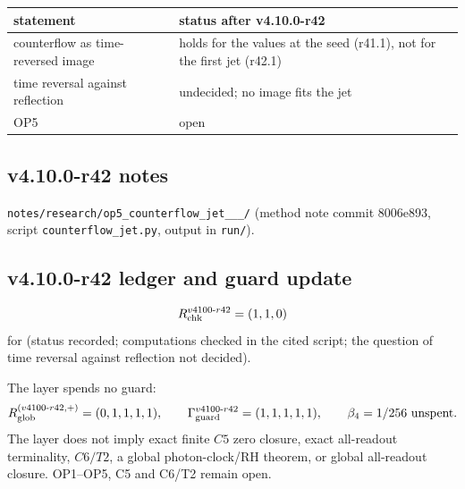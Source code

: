 \begin{center}
\small
\begin{tabular}{@{}>{\raggedright\arraybackslash}p{}>{\raggedright\arraybackslash}p{}@{}}
\toprule
statement & status after v4.10.0-r42\\
\midrule
counterflow as time-reversed image & holds for the values at the seed (r41.1), not for the first jet (r42.1)\\
time reversal against reflection & undecided; no image fits the jet\\
OP5 & open\\
\bottomrule
\end{tabular}
\end{center}

\subsection*{v4.10.0-r42 notes}
\label{subsec:v4100-r42-notes}

\texttt{notes/\allowbreak research/\allowbreak op5\_\allowbreak counterflow\_\allowbreak jet\_\_\_/} (method note commit 8006e893,
script \texttt{counterflow\_\allowbreak jet.py}, output in \texttt{run/}).

\subsection*{v4.10.0-r42 ledger and guard update}
\label{subsec:v4100-r42-ledger-guard}

\[
R_{\rm chk}^{v4100\text{-}r42}=(1,1,0)
\]
for (status recorded; computations checked in the cited script; the question of time reversal against reflection not decided).

The layer spends no guard:
\[
R_{\rm glob}^{(v4100\text{-}r42,+)}=(0,1,1,1,1),
\qquad
\Gamma_{\rm guard}^{v4100\text{-}r42}=(1,1,1,1,1),
\qquad
\beta_4=1/256\ \text{unspent}.
\]
The layer does not imply exact finite \(C5\) zero closure, exact all-readout terminality, \(C6/T2\), a global photon-clock/RH theorem,
or global all-readout closure.  OP1--OP5, C5 and C6/T2 remain open.
